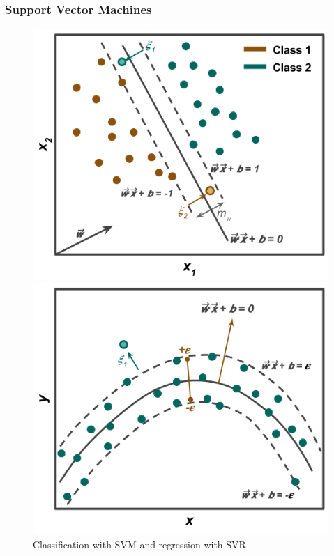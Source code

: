 \begin{frame}
  \frametitle{Support Vector Machines}
  \begin{figure}
    \centering
    \begin{minipage}{0.5\textwidth}
      \centering
      \includegraphics[width=\linewidth]{./figures/svm.png}
    \end{minipage}%
    \begin{minipage}{0.5\textwidth}
      \centering
      \includegraphics[width=\linewidth]{./figures/svr-a.png}
    \end{minipage}
    \caption{Classification with SVM and regression with SVR}
  \end{figure}
\end{frame}

